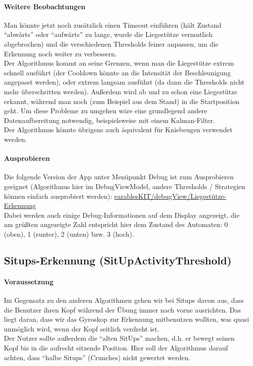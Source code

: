 \documentclass[a4paper,12pt]{article}
\begin{document}
\paragraph{Weitere Beobachtungen}
Man könnte jetzt noch zusätzlich einen Timeout einführen (hält Zustand ``abwärts'' oder ``aufwärts'' zu lange, wurde die Liegestütze vermutlich abgebrochen) und die verschiedenen Thresholds feiner anpassen, um die Erkennung noch weiter zu verbessern.\\
Der Algorithmus kommt an seine Grenzen, wenn man die Liegestütze extrem schnell ausführt (der Cooldown könnte an die Intensität der Beschleunigung angepasst werden), oder extrem langsam ausführt (da dann die Thresholds nicht mehr überschritten werden). Außerdem wird ab und zu schon eine Liegestütze erkannt, während man noch (zum Beispiel aus dem Stand) in die Startposition geht. Um diese Probleme zu umgehen wäre eine grundlegend andere Datenaufbereitung notwendig, beispielsweise mit einem Kalman-Filter.\\
Der Algorithmus könnte übrigens auch äquivalent für Kniebeugen verwendet werden.
\paragraph{Ausprobieren}
Die folgende Version der App unter Menüpunkt Debug ist zum Ausprobieren geeignet (Algorithmus hier im DebugViewModel, andere Thresholds / Strategien können einfach ausprobiert werden): 
\href{https://github.com/vlle1/earablesKIT/commit/6a4999ac8e2613298a6e6dd9bc85092ddd1b6133}{earablesKIT/debugView/Liegestütze-Erkennung}\\
Dabei werden auch einige Debug-Informationen auf dem Display angezeigt, die am grüßten angezeigte Zahl entspricht hier dem Zustand des Automaten: 0 (oben), 1 (runter), 2 (unten) bzw. 3 (hoch).

\subsection{Situps-Erkennung (SitUpActivityThreshold)}
\paragraph{Voraussetzung} 
Im Gegensatz zu den anderen Algorithmen gehen wir bei Situps davon aus, dass die Benutzer ihren Kopf während der Übung immer nach vorne ausrichten. Das liegt daran, dass wir das Gyroskop zur Erkennung mitbenutzen wollten, was quasi unmöglich wird, wenn der Kopf seitlich verdreht ist.\\
Der Nutzer sollte außerdem die ``alten SitUps'' machen, d.h. er bewegt seinen Kopf bis in die aufrecht sitzende Position. Hier soll der Algorithmus darauf achten, dass ``halbe Situps'' (Crunches) nicht gewertet werden.
\end{document}
